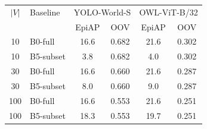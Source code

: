 \begin{tabular}{c l cc cc}
\toprule
$|V|$ & Baseline & \multicolumn{2}{c}{YOLO-World-S} & \multicolumn{2}{c}{OWL-ViT-B/32} \\
 &  & EpiAP & OOV & EpiAP & OOV \\
\midrule
10 & B0-full & 16.6 & 0.682 & 21.6 & 0.302 \\
10 & B5-subset & 3.8 & 0.682 & 4.0 & 0.302 \\
30 & B0-full & 16.6 & 0.660 & 21.6 & 0.287 \\
30 & B5-subset & 8.0 & 0.660 & 9.0 & 0.287 \\
100 & B0-full & 16.6 & 0.553 & 21.6 & 0.251 \\
100 & B5-subset & 18.3 & 0.553 & 19.7 & 0.251 \\
\bottomrule
\end{tabular}

